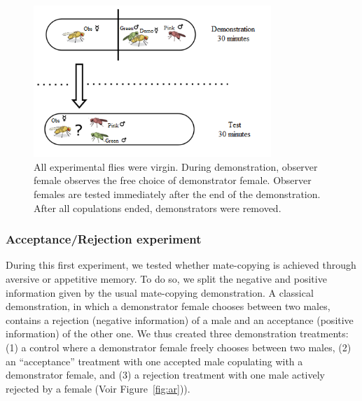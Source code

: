 \documentclass[a4paper, 12pt]{article}
\begin{document}
	\bigskip
	\begin{figure}[h]
	\vspace{5cm}
	\centering
	\includegraphics[width=0.8\textwidth]{images/classic}
	\caption{All experimental flies were virgin. During demonstration, observer female observes the free choice of demonstrator female. Observer females are tested immediately after the end of the demonstration. After all copulations ended, demonstrators were removed.}
	\label{fig:classic protocol}
	\end{figure}

\clearpage

	\subsubsection{Acceptance/Rejection experiment}
	
	During this first experiment, we tested whether mate-copying is achieved through aversive or appetitive memory. To do so, we split the negative and positive information given by the usual mate-copying demonstration. A classical demonstration, in which a demonstrator female chooses between two males, contains a rejection (negative information) of a male and an acceptance (positive information) of the other one. We thus created three demonstration treatments: (1) a control where a demonstrator female freely chooses between two males, (2) an “acceptance” treatment with one accepted male copulating with a demonstrator female, and (3) a rejection treatment with one male actively rejected by a female (Voir Figure~\ref{fig:ar})).
	
\end{document}
